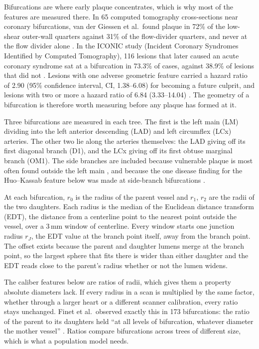 Bifurcations are where early plaque concentrates, which is why most of the features are measured there.
In 65 computed tomography cross-sections near coronary bifurcations, van der Giessen et al.\ found plaque in 72\% of the low-shear outer-wall quarters against 31\% of the flow-divider quarters, and never at the flow divider alone \cite{vandergiessen2009bifurcation}.
In the ICONIC study (Incident Coronary Syndromes Identified by Computed Tomography), 116 lesions that later caused an acute coronary syndrome sat at a bifurcation in 73.3\% of cases, against 38.9\% of lesions that did not \cite{han2022plaque}.
Lesions with one adverse geometric feature carried a hazard ratio of 2.90 (95\% confidence interval, CI, 1.38--6.08) for becoming a future culprit, and lesions with two or more a hazard ratio of 6.84 (3.33--14.04) \cite{han2022plaque}.
The geometry of a bifurcation is therefore worth measuring before any plaque has formed at it.

Three bifurcations are measured in each tree.
The first is the left main (LM) dividing into the left anterior descending (LAD) and left circumflex (LCx) arteries.
The other two lie along the arteries themselves: the LAD giving off its first diagonal branch (D1), and the LCx giving off its first obtuse marginal branch (OM1).
The side branches are included because vulnerable plaque is most often found outside the left main \cite{shen2026geometry}, and because the one disease finding for the Huo--Kassab feature below was made at side-branch bifurcations \cite{schoenenberger2012murray}.

At each bifurcation, $r_0$ is the radius of the parent vessel and $r_1$, $r_2$ are the radii of the two daughters.
Each radius is the median of the Euclidean distance transform (EDT), the distance from a centerline point to the nearest point outside the vessel, over a 3\,mm window of centerline.
Every window starts one junction radius $r_J$, the EDT value at the branch point itself, away from the branch point.
The offset exists because the parent and daughter lumens merge at the branch point, so the largest sphere that fits there is wider than either daughter and the EDT reads close to the parent's radius whether or not the lumen widens.

The caliber features below are ratios of radii, which gives them a property absolute diameters lack.
If every radius in a scan is multiplied by the same factor, whether through a larger heart or a different scanner calibration, every ratio stays unchanged.
Finet et al.\ observed exactly this in 173 bifurcations: the ratio of the parent to its daughters held ``at all levels of bifurcation, whatever diameter the mother vessel'' \cite{finet2008fractal}.
Ratios compare bifurcations across trees of different size, which is what a population model needs.

